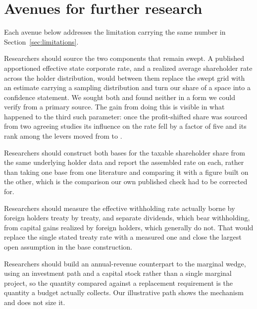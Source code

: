 \section{Avenues for further research}
\label{sec:future}

Each avenue below addresses the limitation carrying the same number in
Section~\ref{sec:limitations}.

\begin{description}[leftmargin=2.4em,style=nextline]

  \item[FR1] Researchers should source the two components that remain swept. A published
  apportioned effective state corporate rate, and a realized average shareholder rate across the
  holder distribution, would between them replace the swept grid with an estimate carrying a
  sampling distribution and turn our share of a space into a confidence statement. We sought
  both and found neither in a form we could verify from a primary source. The gain from doing
  this is visible in what happened to the third such parameter: once the profit-shifted share
  was sourced from two agreeing studies its influence on the rate fell by a factor of five and
  its rank among the levers moved from  to .

  \item[FR2] Researchers should construct both bases for the taxable shareholder share from the
  same underlying holder data and report the assembled rate on each, rather than taking one base
  from one literature and comparing it with a figure built on the other, which is the comparison
  our own published check had to be corrected for.

  \item[FR3] Researchers should measure the effective withholding rate actually borne by foreign
  holders treaty by treaty, and separate dividends, which bear withholding, from capital gains
  realized by foreign holders, which generally do not. That would replace the single stated
  treaty rate with a measured one and close the largest open assumption in the base construction.

  \item[FR4] Researchers should build an annual-revenue counterpart to the marginal wedge, using
  an investment path and a capital stock rather than a single marginal project, so the quantity
  compared against a replacement requirement is the quantity a budget actually collects. Our
  illustrative path shows the mechanism and does not size it.


\end{description}
